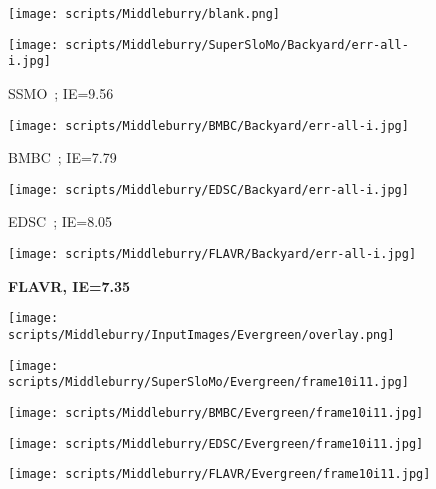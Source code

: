 \documentclass[10pt,twocolumn,letterpaper]{article}
\begin{document}
\begin{table*}[!t]
\begin{figure*}[t]
\begin{center}
     \begin{subfigure}[b]{0.18\textwidth}
        \centering
        \texttt{[image: scripts/Middleburry/blank.png]}
    \end{subfigure}
    \hfill
    \begin{subfigure}[b]{0.18\textwidth}
        \centering
        \texttt{[image: scripts/Middleburry/SuperSloMo/Backyard/err-all-i.jpg]}
        \caption*{SSMO~\cite{jiang2018super}; IE=9.56}
    \end{subfigure}
    \hfill
    \begin{subfigure}[b]{0.18\textwidth}
        \centering
        \texttt{[image: scripts/Middleburry/BMBC/Backyard/err-all-i.jpg]}
        \caption*{BMBC~\cite{park2020bmbc}; IE=7.79}
    \end{subfigure}
    \hfill
    \begin{subfigure}[b]{0.18\textwidth}
        \centering
        \texttt{[image: scripts/Middleburry/EDSC/Backyard/err-all-i.jpg]}
        \caption*{EDSC~\cite{cheng2020multiple}; IE=8.05}
    \end{subfigure}
    \hfill
    \begin{subfigure}[b]{0.18\textwidth}
        \centering
        \texttt{[image: scripts/Middleburry/FLAVR/Backyard/err-all-i.jpg]}
        \caption*{\textbf{FLAVR, IE=7.35}}
    \end{subfigure}
    
\vspace{1em}
    \begin{subfigure}[b]{0.18\textwidth}
        \centering
        \texttt{[image: scripts/Middleburry/InputImages/Evergreen/overlay.png]}
    \end{subfigure}
    \hfill
    \begin{subfigure}[b]{0.18\textwidth}
        \centering
        \texttt{[image: scripts/Middleburry/SuperSloMo/Evergreen/frame10i11.jpg]}
    \end{subfigure}
    \hfill
    \begin{subfigure}[b]{0.18\textwidth}
        \centering
        \texttt{[image: scripts/Middleburry/BMBC/Evergreen/frame10i11.jpg]}
    \end{subfigure}
    \hfill
    \begin{subfigure}[b]{0.18\textwidth}
        \centering
        \texttt{[image: scripts/Middleburry/EDSC/Evergreen/frame10i11.jpg]}
    \end{subfigure}
    \hfill
    \begin{subfigure}[b]{0.18\textwidth}
        \centering
        \texttt{[image: scripts/Middleburry/FLAVR/Evergreen/frame10i11.jpg]}
    \end{subfigure}



\end{center}
\end{figure*}
\end{table*}
\end{document}
